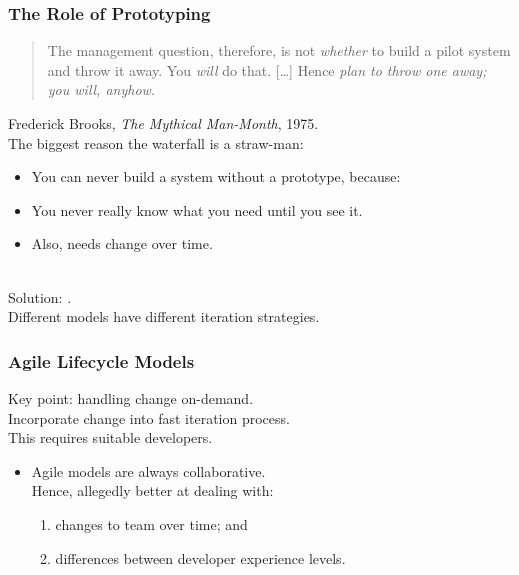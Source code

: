 \begin{frame}
\frametitle{The Role of Prototyping}

\begin{changemargin}{1cm}
\begin{quote}
The management question, therefore, is not {\em whether} to build a pilot system and throw it away. You {\em will} do that. [\ldots] Hence {\em plan to throw one away; you will, anyhow}.
\end{quote}
\hfill Frederick Brooks, \emph{The Mythical Man-Month}, 1975.
~\\[1em]

The biggest reason the waterfall is a straw-man: 
\begin{itemize}
\item You can never build a system without a prototype, because:
\item You never really know what you need until you see it.
\item Also, needs change over time.
\end{itemize}
~\\

Solution: .\\Different models have different iteration strategies.

\end{changemargin}
\end{frame}

\begin{frame}
\frametitle{Agile Lifecycle Models}

\begin{changemargin}{1cm}
Key point: handling change on-demand.\\[1em]
Incorporate change into fast iteration process.\\[1em]

This requires suitable developers.
\begin{itemize}
\item Agile models are always collaborative.\\
 Hence, allegedly better at dealing with:
\begin{enumerate}
\item changes to team over time; and
\item differences between developer experience levels.
\end{enumerate}
\end{itemize}

\end{changemargin}
\end{frame}


